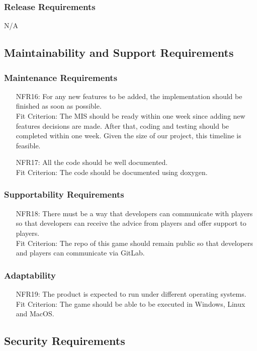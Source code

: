 \documentclass[12pt]{article}
\begin{document}
\subsubsection{Release Requirements}
N/A
\subsection{Maintainability and Support Requirements}
\subsubsection{Maintenance Requirements}
\begin{itemize}
\item [NFR16:]For any new features to be added, the implementation should be finished as soon as possible.\\ Fit Criterion: The MIS should be ready within one week since 
adding new features decisions are made. After that, coding
and testing should be completed within one week. Given the size
of our project, this timeline is feasible.
\item[NFR17:] All the code should be well documented. \\ Fit Criterion: The code should be documented using doxygen.
\end{itemize}
\subsubsection{Supportability Requirements}
\begin{itemize}
\item[NFR18:] There must be a way that developers can 
communicate with players so that developers can receive the
advice from players and offer support to players.\\Fit Criterion: The repo of this game should remain public so that
developers and players can communicate via GitLab.
\end{itemize}
\subsubsection{Adaptability}
\begin{enumerate}
\item[NFR19:] The product is expected to run under 
different operating systems. \\ Fit Criterion: The game should
be able to be executed in Windows, Linux and MacOS.
\end{enumerate}
\subsection{Security Requirements}
\end{document}
